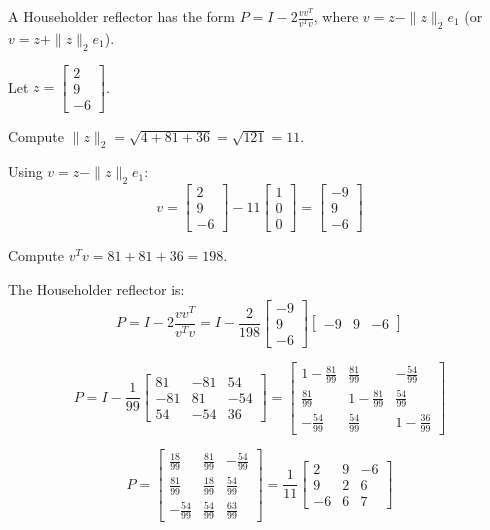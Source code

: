\documentclass[reqno, answers]{exam}
\begin{document}
\begin{enumerate}
\begin{solution}
A Householder reflector has the form $P = I - 2\frac{vv^T}{v^T v}$, where $v = z - \|z\|_2 e_1$ (or $v = z + \|z\|_2 e_1$).

Let $z = \begin{bmatrix} 2 \\ 9 \\ -6 \end{bmatrix}$.

Compute $\|z\|_2 = \sqrt{4 + 81 + 36} = \sqrt{121} = 11$.

Using $v = z - \|z\|_2 e_1$:
\[
v = \begin{bmatrix} 2 \\ 9 \\ -6 \end{bmatrix} - 11 \begin{bmatrix} 1 \\ 0 \\ 0 \end{bmatrix} = \begin{bmatrix} -9 \\ 9 \\ -6 \end{bmatrix}
\]

Compute $v^T v = 81 + 81 + 36 = 198$.

The Householder reflector is:
\[
P = I - 2\frac{vv^T}{v^T v} = I - \frac{2}{198} \begin{bmatrix} -9 \\ 9 \\ -6 \end{bmatrix} \begin{bmatrix} -9 & 9 & -6 \end{bmatrix}
\]

\[
P = I - \frac{1}{99} \begin{bmatrix} 81 & -81 & 54 \\ -81 & 81 & -54 \\ 54 & -54 & 36 \end{bmatrix} = \begin{bmatrix} 1 - \frac{81}{99} & \frac{81}{99} & -\frac{54}{99} \\ \frac{81}{99} & 1 - \frac{81}{99} & \frac{54}{99} \\ -\frac{54}{99} & \frac{54}{99} & 1 - \frac{36}{99} \end{bmatrix}
\]

\[
P = \begin{bmatrix} \frac{18}{99} & \frac{81}{99} & -\frac{54}{99} \\ \frac{81}{99} & \frac{18}{99} & \frac{54}{99} \\ -\frac{54}{99} & \frac{54}{99} & \frac{63}{99} \end{bmatrix} = \frac{1}{11} \begin{bmatrix} 2 & 9 & -6 \\ 9 & 2 & 6 \\ -6 & 6 & 7 \end{bmatrix}
\]
\end{solution}


\end{enumerate}
\end{document}
